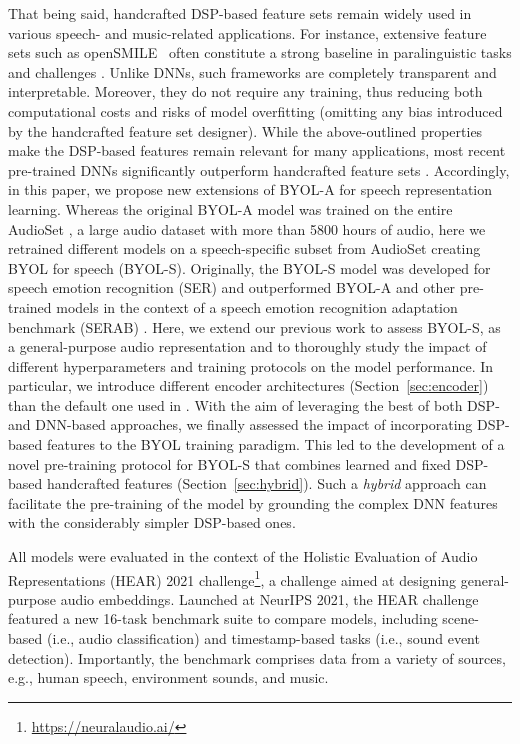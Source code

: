 That being said, handcrafted DSP-based feature sets remain widely used in various speech- and music-related applications. For instance, extensive feature sets such as openSMILE~\citep{eyben2010opensmile} often constitute a strong baseline in paralinguistic tasks and challenges \citep{schuller2013interspeech, schuller2016interspeech, schuller2020interspeech}. Unlike DNNs, such frameworks are completely transparent and interpretable. Moreover, they do not require any training, thus reducing both computational costs and risks of model overfitting (omitting any bias introduced by the handcrafted feature set designer). While the above-outlined properties make the DSP-based features remain relevant for many applications, most recent pre-trained DNNs significantly outperform handcrafted feature sets \citep{shor2020towards, scheidwasser2021serab}.
Accordingly, in this paper, we propose new extensions of BYOL-A for speech representation learning. Whereas the original BYOL-A model was trained on the entire AudioSet \citep{gemmeke2017audio}, a large audio dataset with more than 5800 hours of audio, here we retrained different models on a speech-specific subset from AudioSet creating BYOL for speech (BYOL-S). Originally, the BYOL-S model was developed for speech emotion recognition (SER) and outperformed BYOL-A and other pre-trained models in the context of a speech emotion recognition adaptation benchmark (SERAB) \citep{scheidwasser2021serab}. Here, we extend our previous work to assess BYOL-S, as a general-purpose audio representation and to thoroughly study the impact of different hyperparameters and training protocols on the model performance. In particular, we introduce different encoder architectures (Section~\ref{sec:encoder}) than the default one used in \citet{niizumi2021byol}. With the aim of leveraging the best of both DSP- and DNN-based approaches, we finally assessed the impact of incorporating DSP-based features to the BYOL training paradigm. This led to the development of a novel pre-training protocol for BYOL-S that combines learned and fixed DSP-based handcrafted features (Section~\ref{sec:hybrid}). Such a \textit{hybrid} approach can facilitate the pre-training of the model by grounding the complex DNN features with the considerably simpler DSP-based ones.


All models were evaluated in the context of the Holistic Evaluation of Audio Representations (HEAR) 2021 challenge\footnote{\url{https://neuralaudio.ai/}}, a challenge aimed at designing general-purpose audio embeddings. Launched at NeurIPS 2021, the HEAR challenge featured a new 16-task benchmark suite to compare models, including scene-based (i.e., audio classification) and timestamp-based tasks (i.e., sound event detection). Importantly, the benchmark comprises data from a variety of sources, e.g., human speech, environment sounds, and music.









%
